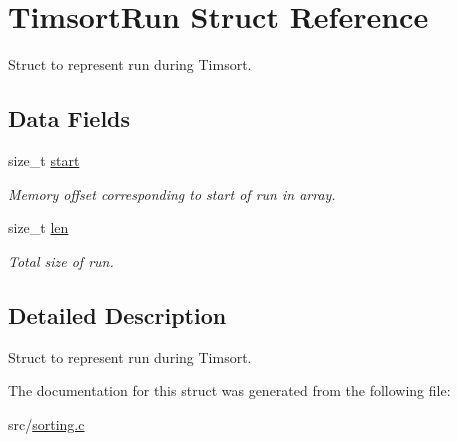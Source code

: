\hypertarget{structTimsortRun}{}\section{Timsort\+Run Struct Reference}
\label{structTimsortRun}


Struct to represent run during Timsort.  


\subsection*{Data Fields}
\begin{DoxyCompactItemize}
\item 
\mbox{\label{structTimsortRun_a8e8eeaff3401b5d5f29b73f9007475b5}} 
size\+\_\+t \hyperlink{structTimsortRun_a8e8eeaff3401b5d5f29b73f9007475b5}{start}
\begin{DoxyCompactList}\small\item\em Memory offset corresponding to start of run in array. \end{DoxyCompactList}\item 
\mbox{\label{structTimsortRun_a90c1a2b4de2a6132ba3e1a06ce8d715f}} 
size\+\_\+t \hyperlink{structTimsortRun_a90c1a2b4de2a6132ba3e1a06ce8d715f}{len}
\begin{DoxyCompactList}\small\item\em Total size of run. \end{DoxyCompactList}\end{DoxyCompactItemize}


\subsection{Detailed Description}
Struct to represent run during Timsort. 

The documentation for this struct was generated from the following file\+:\begin{DoxyCompactItemize}
\item 
src/\hyperlink{sorting_8c}{sorting.\+c}\end{DoxyCompactItemize}
